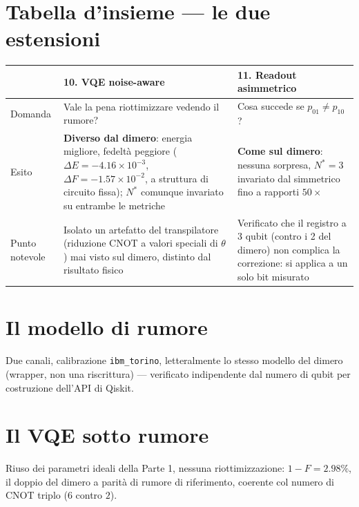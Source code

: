 \documentclass[11pt,a4paper]{article}
\begin{document}
\clearpage

\section{Tabella d'insieme --- le due estensioni}

\begin{center}
\small
\renewcommand{\arraystretch}{1.35}
\begin{tabular}{@{}p{3.4cm}p{6.6cm}p{6.6cm}@{}}
\toprule
\rowcolor{grigetto}
 & \textbf{10. VQE noise-aware} & \textbf{11. Readout asimmetrico} \\
\midrule
Domanda &
Vale la pena riottimizzare vedendo il rumore? &
Cosa succede se $p_{01}\neq p_{10}$? \\
\addlinespace
Esito &
\textbf{Diverso dal dimero}: energia migliore, fedeltà peggiore
($\Delta E{=}{-}4.16{\times}10^{-3}$, $\Delta F{=}{-}1.57{\times}10^{-2}$,
a struttura di circuito fissa); $N^*$ comunque invariato su entrambe le
metriche &
\textbf{Come sul dimero}: nessuna sorpresa, $N^*=3$ invariato dal
simmetrico fino a rapporti $50\times$ \\
\addlinespace
Punto notevole &
Isolato un artefatto del transpilatore (riduzione CNOT a valori speciali
di $\theta$) mai visto sul dimero, distinto dal risultato fisico &
Verificato che il registro a 3 qubit (contro i 2 del dimero) non
complica la correzione: si applica a un solo bit misurato \\
\bottomrule
\end{tabular}
\end{center}

\section{Il modello di rumore}

Due canali, calibrazione \texttt{ibm\_torino}, letteralmente lo stesso
modello del dimero (wrapper, non una riscrittura) --- verificato
indipendente dal numero di qubit per costruzione dell'API di Qiskit.

\section{Il VQE sotto rumore}

Riuso dei parametri ideali della Parte 1, nessuna riottimizzazione:
$1-F=2.98\%$, il doppio del dimero a parità di rumore di riferimento,
coerente col numero di CNOT triplo ($6$ contro $2$).
\end{document}
